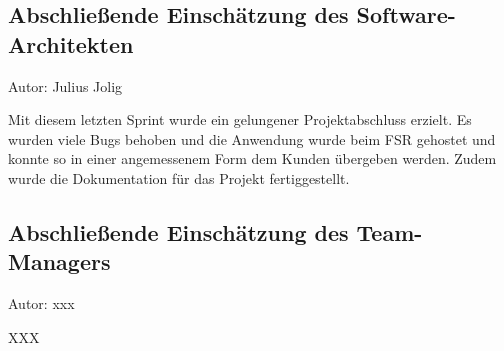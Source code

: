 \subsection{Abschließende Einschätzung des Software-Architekten}
{\small Autor: Julius Jolig}

Mit diesem letzten Sprint wurde ein gelungener Projektabschluss erzielt. Es wurden viele Bugs behoben und die Anwendung wurde beim FSR gehostet und konnte so in einer angemessenem Form dem Kunden übergeben werden. Zudem wurde die Dokumentation für das Projekt fertiggestellt. 

\subsection{Abschließende Einschätzung des Team-Managers}
{\small Autor: xxx}

XXX
